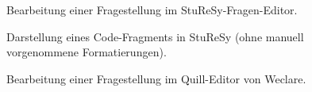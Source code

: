 \begin{figure}[H]
    \centering
    \setlength{\fboxsep}{0pt}
    \setlength{\fboxrule}{0.5pt}
    \caption[StuReSy-Fragen-Editor]{Bearbeitung einer Fragestellung im StuReSy-Fragen-Editor.}
    \label{abb:sturesy_editor}
\end{figure}

\begin{figure}[H]
    \centering
    \setlength{\fboxsep}{0pt}
    \setlength{\fboxrule}{0.5pt}
    \caption[Darstellung eines Code-Fragments in StuReSy]{Darstellung eines Code-Fragments in StuReSy (ohne manuell vorgenommene Formatierungen).}
    \label{abb:sturesy_code_fragment}
\end{figure}


\begin{figure}[H]
    \centering
    \setlength{\fboxsep}{0pt}
    \setlength{\fboxrule}{0.5pt}
    \caption[Quill-Editor von Weclare]{Bearbeitung einer Fragestellung im Quill-Editor von Weclare.}
    \label{abb:weclare_quill}
\end{figure}

